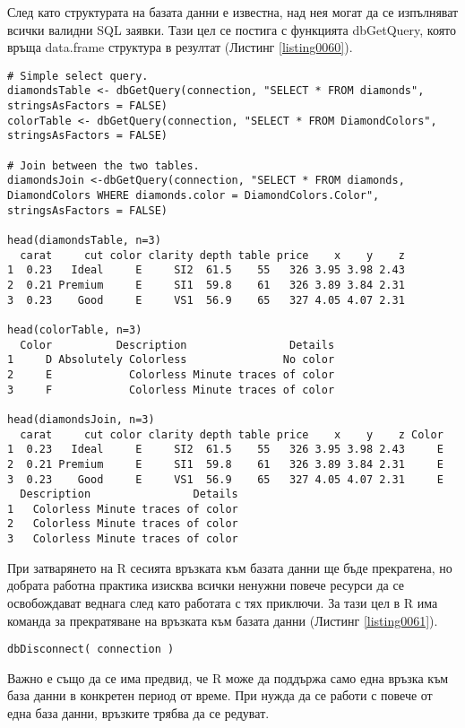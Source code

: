 След като структурата на базата данни е известна, над нея могат да се изпълняват всички валидни SQL заявки. Тази цел се постига с функцията dbGetQuery, която връща data.frame структура в резултат (Листинг \ref{listing0060}). 

\begin{lstlisting}[caption=Изследване на базата данни, label=listing0060]
# Simple select query.
diamondsTable <- dbGetQuery(connection, "SELECT * FROM diamonds", stringsAsFactors = FALSE)
colorTable <- dbGetQuery(connection, "SELECT * FROM DiamondColors", stringsAsFactors = FALSE)

# Join between the two tables.
diamondsJoin <-dbGetQuery(connection, "SELECT * FROM diamonds, DiamondColors WHERE diamonds.color = DiamondColors.Color", stringsAsFactors = FALSE)

head(diamondsTable, n=3)
  carat     cut color clarity depth table price    x    y    z
1  0.23   Ideal     E     SI2  61.5    55   326 3.95 3.98 2.43
2  0.21 Premium     E     SI1  59.8    61   326 3.89 3.84 2.31
3  0.23    Good     E     VS1  56.9    65   327 4.05 4.07 2.31
 
head(colorTable, n=3)
  Color          Description                Details
1     D Absolutely Colorless               No color
2     E            Colorless Minute traces of color
3     F            Colorless Minute traces of color

head(diamondsJoin, n=3)
  carat     cut color clarity depth table price    x    y    z Color
1  0.23   Ideal     E     SI2  61.5    55   326 3.95 3.98 2.43     E
2  0.21 Premium     E     SI1  59.8    61   326 3.89 3.84 2.31     E
3  0.23    Good     E     VS1  56.9    65   327 4.05 4.07 2.31     E
  Description                Details
1   Colorless Minute traces of color
2   Colorless Minute traces of color
3   Colorless Minute traces of color
\end{lstlisting}

При затварянето на R сесията връзката към базата данни ще бъде прекратена, но добрата работна практика изисква всички ненужни повече ресурси да се освобождават веднага след като работата с тях приключи. За тази цел в R има команда за прекратяване на връзката към базата данни (Листинг \ref{listing0061}).

\begin{lstlisting}[caption=Откачане на връзката към базата данни, label=listing0061]
dbDisconnect( connection )
\end{lstlisting}

Важно е също да се има предвид, че R може да поддържа само една връзка към база данни в конкретен период от време. При нужда да се работи с повече от една база данни, връзките трябва да се редуват. 

